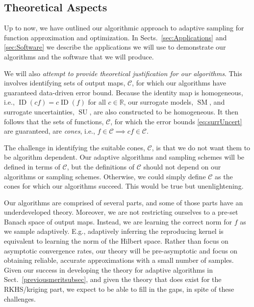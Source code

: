 \documentclass[11pt]{NSFamsart}
\DeclareMathOperator{\SURR}{SM} %
\DeclareMathOperator{\ID}{ID}
\DeclareMathOperator{\SURRERR}{SU}
\newcommand{\reals}{{\mathbb{R}}}
\newcommand{\calc}{{\mathcal{C}}}
\begin{document}
\subsection{Theoretical Aspects}

Up to now, we have outlined our algorithmic approach to adaptive sampling for function approximation and optimization. In Sects.\ \ref{sec:Applications} and \ref{sec:Software} we describe the applications we will use to demonstrate our algorithms and the software that we will produce.

We will also \emph{attempt to provide theoretical justification for our algorithms}. This involves identifying sets of output maps, $\calc$, for which our algorithms have guaranteed data-driven error bound. Because the identity map is homogeneous, i.e., $\ID(cf) = c\ID(f)$ for all $c \in \reals$, our surrogate models, $\SURR$, and surrogate uncertainties, $\SURRERR$, are also constructed to be homogeneous. It then follows that the sets of functions, $\calc$, for which the error bounds \eqref{eq:surrUncert} are guaranteed, are \emph{cones}, i.e., $f \in \calc \implies cf \in \calc$.

The challenge in identifying the suitable cones, $\calc$, is that we do not want them to be algorithm dependent. Our adaptive algorithms and sampling schemes will be defined in terms of $\calc$, but the definitions of $\calc$ should not depend on our algorithms or sampling schemes. Otherwise, we could simply define $\calc$ as the cones for which our algorithms succeed. This would be true but unenlightening.

Our algorithms are comprised of several parts, and some of those parts have an underdeveloped theory. Moreover, we are not restricting ourselves to a pre-set Banach space of output maps. Instead, we are learning the correct norm for $f$ as we sample adaptively. E.g., adaptively inferring the reproducing kernel is equivalent to learning the norm of the Hilbert space. Rather than focus on asymptotic convergence rates, our theory will be pre-asymptotic and focus on obtaining reliable, accurate approximations with a small number of samples. Given our success in developing the theory for adaptive algorithms in Sect.\ \ref{previousmeritsubsec}, and given the theory that does exist for the RKHS/kriging part, we expect to be able to fill in the gaps, in spite of these challenges.


\end{document}
